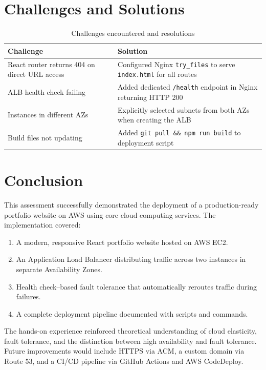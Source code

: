\documentclass[12pt,a4paper]{article}
\begin{document}
\section{Challenges and Solutions}

\begin{table}[H]
\centering
\begin{tabular}{p{5cm}p{7cm}}
\toprule
\textbf{Challenge} & \textbf{Solution} \\
\midrule
React router returns 404 on direct URL access & Configured Nginx \texttt{try\_files} to serve \texttt{index.html} for all routes \\
ALB health check failing & Added dedicated \texttt{/health} endpoint in Nginx returning HTTP 200 \\
Instances in different AZs & Explicitly selected subnets from both AZs when creating the ALB \\
Build files not updating & Added \texttt{git pull \&\& npm run build} to deployment script \\
\bottomrule
\end{tabular}
\caption{Challenges encountered and resolutions}
\end{table}

\section{Conclusion}

This assessment successfully demonstrated the deployment of a production-ready portfolio website on AWS using core cloud computing services. The implementation covered:

\begin{enumerate}[label=\arabic*.]
  \item A modern, responsive React portfolio website hosted on AWS EC2.
  \item An Application Load Balancer distributing traffic across two instances in separate Availability Zones.
  \item Health check–based fault tolerance that automatically reroutes traffic during failures.
  \item A complete deployment pipeline documented with scripts and commands.
\end{enumerate}

The hands-on experience reinforced theoretical understanding of cloud elasticity, fault tolerance, and the distinction between high availability and fault tolerance. Future improvements would include HTTPS via ACM, a custom domain via Route 53, and a CI/CD pipeline via GitHub Actions and AWS CodeDeploy.
\end{document}
